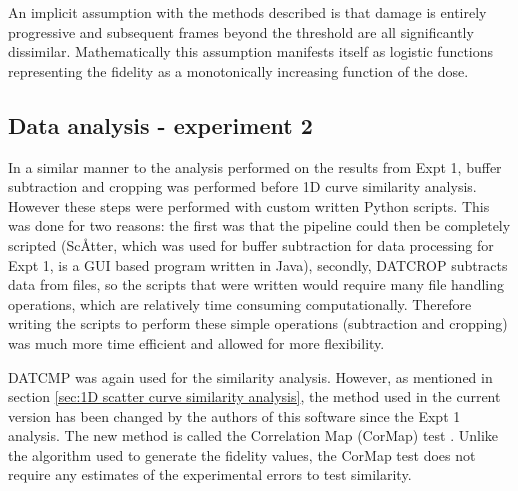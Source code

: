 An implicit assumption with the methods described is that damage is entirely progressive and subsequent frames beyond the threshold are all significantly dissimilar.
Mathematically this assumption manifests itself as logistic functions representing the fidelity as a monotonically increasing function of the dose.

\subsection{Data analysis - experiment 2}
\label{sub:Data analysis - experiment 2}
In a similar manner to the analysis performed on the results from Expt 1, buffer subtraction and cropping was performed before 1D curve similarity analysis.
However these steps were performed with custom written Python scripts.
This was done for two reasons:
the first was that the pipeline could then be completely scripted (Sc\AA tter, which was used for buffer subtraction for data processing for Expt 1, is a GUI based program written in Java),
secondly, DATCROP subtracts data from files, so the scripts that were written would require many file handling operations, which are relatively time consuming computationally.
Therefore writing the scripts to perform these simple operations (subtraction and cropping) was much more time efficient and allowed for more flexibility.

DATCMP was again used for the similarity analysis.
However, as mentioned in section \ref{sec:1D scatter curve similarity analysis}, the method used in the current version has been changed by the authors of this software since the Expt 1 analysis.
The new method is called the Correlation Map (CorMap) test \cite{franke2015correlation}.
Unlike the algorithm used to generate the fidelity values, the CorMap test does not require any estimates of the experimental errors to test similarity.

